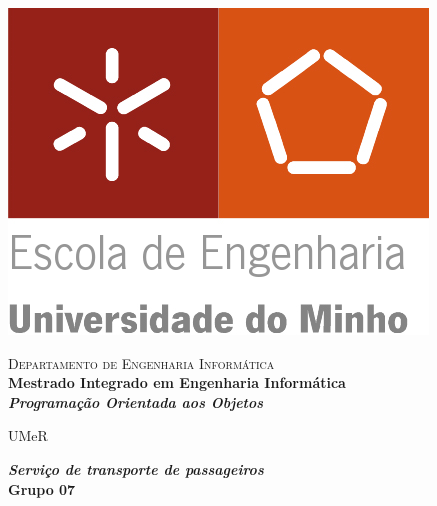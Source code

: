 \begin{titlepage}


\begin{minipage}{0.3\textwidth}
\begin{flushleft} 
\includegraphics[width=\textwidth]{logo.png}
\end{flushleft}
\end{minipage}
\begin{minipage}{0.6\textwidth}
\begin{flushright} 

\textsc{Departamento de Engenharia Informática}\\[0.1cm]
\bfseries Mestrado Integrado em Engenharia Informática \\ [0.1cm]
\bfseries \textit{Programação Orientada aos Objetos}\\[8mm]

\end{flushright}
\end{minipage}


\vspace{3cm}


\begin{center}


\LARGE UMeR

\Large \textbf{\textit{Serviço de transporte de passageiros}}\\[1.5cm]


{\Large \bfseries Grupo 07\\[2cm] }



\end{center}
\end{titlepage}
